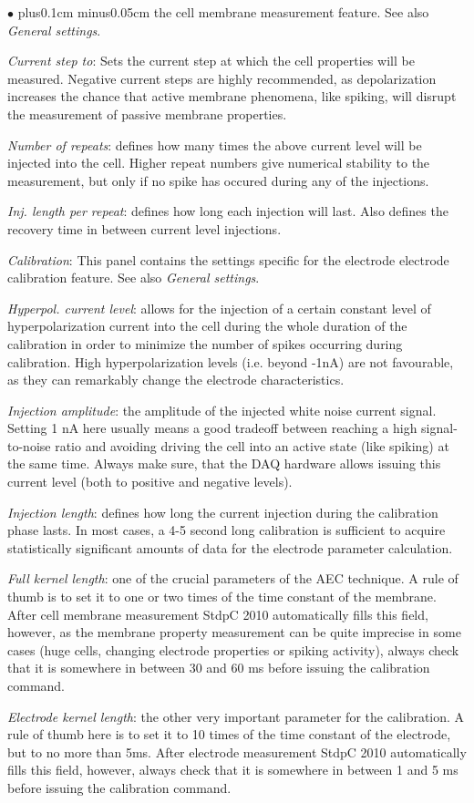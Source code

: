 \documentclass{article}
\newenvironment{myitem}{\begin{list}{$\bullet$}{\setlength{\leftmargin}{1.1em}
\itemsep0.1cm plus0.1cm minus0.05cm
\listparindent0cm
\addtolength{\labelsep}{0.5\labelsep}
\setlength{\labelwidth}{0.8em}
\setlength{\leftmargin}{\labelwidth}
\addtolength{\leftmargin}{\labelsep}
}}{\end{list}}
\begin{document}
\begin{myitem}
  the cell membrane measurement feature. See also \emph{General settings}. 
\item \emph{Current step to}: Sets the current step at which the cell
  properties will be measured. Negative current steps are highly
  recommended, as depolarization increases the chance that active membrane
  phenomena, like spiking, will disrupt the measurement of passive membrane
  properties. 
\item \emph{Number of repeats}: defines how many times the above current level
  will be injected into the cell. Higher repeat numbers give numerical
  stability to the measurement, but only if no spike has occured during any
  of the injections. 
\item \emph{Inj. length per repeat}: defines how long each injection will
  last. Also defines the recovery time in between current level injections. 
\item \emph{Calibration}: This panel contains the settings specific for
  the electrode electrode calibration feature. See also \emph{General
    settings}.
\item \emph{Hyperpol. current level}: allows for the injection of a certain
  constant level of  hyperpolarization current into the cell during the
  whole duration of the calibration in order to minimize the number of
  spikes occurring during calibration. High hyperpolarization levels
  (i.e. beyond -1nA) are not favourable, as they can remarkably change the electrode 
  characteristics.
\item \emph{Injection amplitude}: the amplitude of the injected
  white noise current signal. Setting 1 nA here usually means a good
  tradeoff between reaching a high signal-to-noise ratio and avoiding
  driving the cell into 
  an active state (like spiking) at the same time. Always make sure, that
  the DAQ hardware allows issuing this current level (both to
  positive and negative levels).
\item \emph{Injection length}: defines how long the current injection during
  the calibration phase lasts. In most cases, a 4-5 second long calibration
  is sufficient to acquire statistically significant amounts of data for the
  electrode parameter calculation.   
\item \emph{Full kernel length}: one of the crucial parameters of the AEC
  technique. A rule of thumb is to set it to one or two times of the time constant of
  the membrane. After cell membrane measurement StdpC 2010 automatically
  fills this field, however, as the membrane property measurement can be
  quite imprecise in some cases (huge cells, changing electrode properties
  or spiking activity), always check that it is somewhere in between 30 and
  60 ms before issuing the calibration command.
\item \emph{Electrode kernel length}: the other very important parameter for
  the calibration. A rule of thumb here is to set it to 10 times of the
  time constant of the electrode, but to no more than 5ms. After electrode
  measurement StdpC 2010 automatically fills this field, however, always
  check that it is somewhere in between 1 and 5 ms before issuing the
  calibration command.
\end{myitem}
\end{document}
